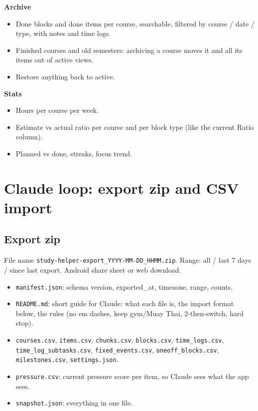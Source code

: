 \documentclass[11pt,a4paper]{article}
\newcommand{\code}[1]{\texttt{\small #1}}
\begin{document}
\textbf{Archive}
\begin{itemize}
  \item Done blocks and done items per course, searchable, filtered by course / date / type, with notes and time logs.
  \item Finished courses and old semesters: archiving a course moves it and all its items out of active views.
  \item Restore anything back to active.
\end{itemize}

\textbf{Stats}
\begin{itemize}
  \item Hours per course per week.
  \item Estimate vs actual ratio per course and per block type (like the current Ratio column).
  \item Planned vs done, streaks, focus trend.
\end{itemize}

\section{Claude loop: export zip and CSV import}

\subsection{Export zip}
File name \code{study-helper-export\_YYYY-MM-DD\_HHMM.zip}. Range: all / last 7 days / since last export. Android share sheet or web download.
\begin{itemize}
  \item \code{manifest.json}: schema version, exported\_at, timezone, range, counts.
  \item \code{README.md}: short guide for Claude: what each file is, the import format below, the rules (no em dashes, keep gym/Muay Thai, 2-then-switch, hard stop).
  \item \code{courses.csv}, \code{items.csv}, \code{chunks.csv}, \code{blocks.csv}, \code{time\_logs.csv}, \code{time\_log\_subtasks.csv}, \code{fixed\_events.csv}, \code{oneoff\_blocks.csv}, \code{milestones.csv}, \code{settings.json}.
  \item \code{pressure.csv}: current pressure score per item, so Claude sees what the app sees.
  \item \code{snapshot.json}: everything in one file.
\end{itemize}
\end{document}
